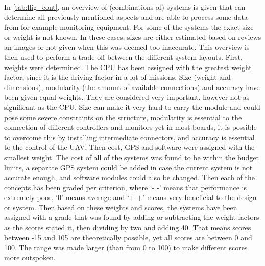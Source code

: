 In \autoref{tab:flig_cont}, an overview of (combinations of) systems is given that can determine all previously mentioned aspects and are able to process some data from for example monitoring equipment. For some of the systems the exact size or weight is not known. In these cases, sizes are either estimated based on reviews an images or not given when this was deemed too inaccurate. %
This overview is then used to perform a trade-off between the different system layouts. First, weights were determined. The CPU has been assigned with the greatest weight factor, since it is the driving factor in a lot of missions. Size (weight and dimensions), modularity (the amount of available connections) and accuracy have been given equal weights. They are considered very important, however not as significant as the CPU. Size can make it very hard to carry the module and could pose some severe constraints on the structure, modularity is essential to the connection of different controllers and monitors yet in most boards, it is possible to overcome this by installing intermediate connectors, and accuracy is essential to the control of the UAV. Then cost, GPS and software were assigned with the smallest weight. The cost of all of the systems was found to be within the budget limits, a separate GPS system could be added in case the current system is not accurate enough, and software modules could also be changed. Then each of the concepts has been graded per criterion, where `- -' means that performance is extremely poor, `0' means average and `+ +' means very beneficial to the design or system. Then based on these weights and scores, the systems have been assigned with a grade that was found by adding or subtracting the weight factors as the scores stated it, then dividing by two and adding 40. That means scores between -15 and 105 are theoretically possible, yet all scores are between 0 and 100. The range was made larger (than from 0 to 100) to make different scores more outspoken.




